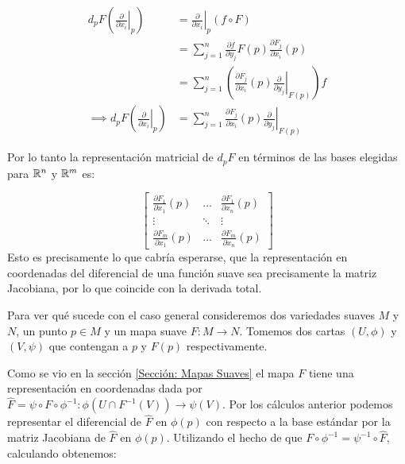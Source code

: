 \begin{align*}
	d_{p}F
	\left(
	\left. \frac{\partial}{\partial x_i} \right|_{p}
	\right)
	 & =
	\left. \frac{\partial}{\partial x_i} \right|_{p} (f \circ F) \\
	 & =
	\sum_{j=1}^{n} \frac{\partial f}{\partial y_j} F(p)
	\frac{\partial F_j}{\partial x_i} (p)                        \\
	 & =
	\sum_{j=1}^{n}
	\left(
	\frac{\partial F_j}{\partial x_i} (p)
	\left.
	\frac{\partial}{\partial y_j}
	\right|_{F(p)}
	\right) f                                                    \\
	\implies d_p F
	\left(
	\left. \frac{\partial}{\partial x_i} \right|_p
	\right)
	 & =
	\sum_{j=1}^{n}
	\frac{\partial F_j}{\partial x_i} (p)
	\left.
	\frac{\partial}{\partial y_j}
	\right|_{F(p)}
\end{align*}

Por lo tanto la representación matricial de $d_{p}F$ en términos de las bases elegidas para $\mathbb{R}^n$ y $\mathbb{R}^m$ es:

\[
	\begin{bmatrix}
		\frac{\partial F_1}{\partial x_1}(p) & \hdots & \frac{\partial F_1}{\partial x_n}(p) \\[1em]
		\vdots                               & \ddots & \vdots                               \\[1em]
		\frac{\partial F_m}{\partial x_1}(p) & \hdots & \frac{\partial F_m}{\partial x_n}(p)
	\end{bmatrix}
\]
Esto es precisamente lo que cabría esperarse, que la representación en coordenadas del diferencial de una función suave sea precisamente la matriz Jacobiana, por lo que coincide con la derivada total.

Para ver qué sucede con el caso general consideremos dos variedades suaves $M$ y $N$, un punto $p \in M$ y un mapa suave $F: M \to N$. Tomemos dos cartas $(U,\phi)$ y $(V,\psi)$ que contengan a $p$ y $F(p)$ respectivamente.

Como se vio en la sección \ref{Sección: Mapas Suaves} el mapa $F$ tiene una representación en coordenadas dada por $\hat{F} = \psi \circ F \circ \phi^{-1}: \phi(U \cap F^{-1}(V)) \to \psi(V)$. Por los cálculos anterior podemos representar el diferencial de $\hat{F}$ en $\phi(p)$ con respecto a la base estándar por la matriz Jacobiana de $\hat{F}$ en $\phi(p)$. Utilizando el hecho de que $F \circ \phi^{-1} = \psi^{-1} \circ \hat{F}$, calculando obtenemos:

